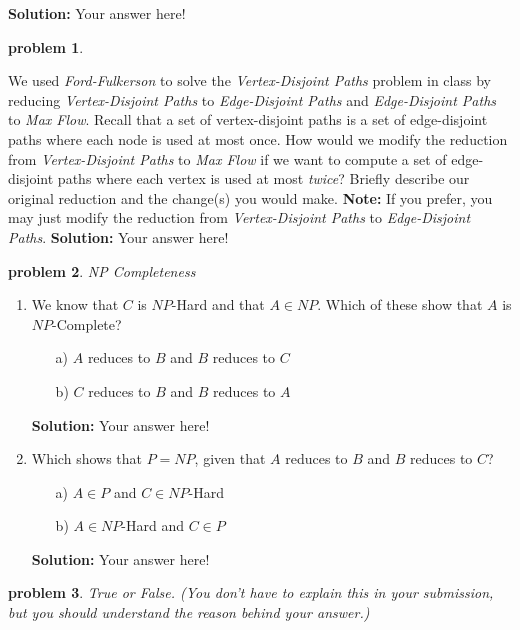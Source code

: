 \documentclass[10pt]{article}
\newcommand{\solution}[1]{\color{blue}\hfill\break\noindent\textbf{Solution:} #1\color{black}}
\newtheorem{problem}{\sc\color{cit}problem}
\begin{document}
\solution{
Your answer here!
}
  
 
\begin{problem}\end{problem}
We used \emph{Ford-Fulkerson} to solve the \emph{Vertex-Disjoint Paths} problem in class by reducing
\emph{Vertex-Disjoint Paths} to \emph{Edge-Disjoint Paths} and 
\emph{Edge-Disjoint Paths} to \emph{Max Flow}. Recall that a set of vertex-disjoint paths is
a set of edge-disjoint paths where each node is used at most once. How would we modify the reduction from \emph{Vertex-Disjoint Paths} to \emph{Max Flow} if we want to compute a set of edge-disjoint paths where each vertex is used at most {\em twice}? Briefly describe our original reduction and the change(s) you would make. {\bf Note:} If you prefer, you may just modify the reduction from \emph{Vertex-Disjoint Paths} to \emph{Edge-Disjoint Paths}.
\solution{
    Your answer here!
}


\begin{problem}NP Completeness\end{problem}
\begin{enumerate}
    \item We know that $C$ is $NP$-Hard and that $A \in NP$.  Which of these show that $A$ is $NP$-Complete?
    \begin{itemize}
        \item[a)] $A$ reduces to $B$ and $B$ reduces to $C$
        \item[b)] $C$ reduces to $B$ and $B$ reduces to $A$
    \end{itemize}
    \solution{
    Your answer here!
    }

    
    \item Which shows that $P = NP$, given that $A$ reduces to $B$ and $B$ reduces to $C$?
    \begin{itemize}
        \item[a)] $A \in P$ and $C \in NP$-Hard
        \item[b)] $A \in NP$-Hard and $C \in P$
    \end{itemize}
    \solution{
    Your answer here!
    }

\end{enumerate}


\begin{problem} True or False. (You don't have to explain this in your submission, but you should understand the reason behind your answer.)  \end{problem}
\end{document}
